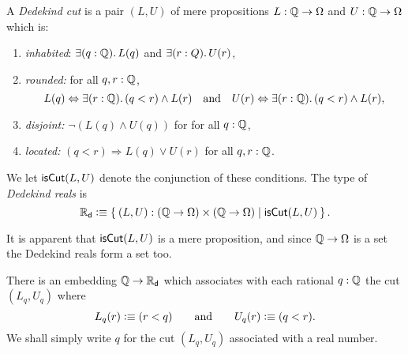 \begin{defn}
  A \emph{Dedekind cut} is a pair $(L, U)$ of mere propositions $L : \mathbb{Q} \to \Omega$ and $U
  : \mathbb{Q} \to \Omega$ which is:
  \begin{enumerate}
  \item \emph{inhabited}: $\exis{q : \Q} L(q)$ and $\exis{r : Q} U(r)$,
  \item \emph{rounded:} for all $q, r : \mathbb{Q}$,
    \begin{equation*}
      L(q) \Leftrightarrow \exis{r : \Q} (q < r) \land L(r)
      \quad\text{and}\quad
      U(r) \Leftrightarrow \exis{r : \Q} (q < r) \land L(r),
    \end{equation*}
  \item \emph{disjoint:} $\lnot (L(q) \land U(q))$ for for all $q : \mathbb{Q}$,
  \item \emph{located:} $(q < r) \Rightarrow L(q) \lor U(r)$ for all $q, r : \mathbb{Q}$.
  \end{enumerate}
  We let $\mathsf{isCut}(L, U)$ denote the conjunction of these conditions. The type of
  \emph{Dedekind reals} is
  \begin{equation*}
    \RD \defeq \setof{ (L, U) : (\Q \to \Omega) \times (\Q \to \Omega) | \dcut(L,U)}.
  \end{equation*}
\end{defn}

It is apparent that $\mathsf{isCut}(L, U)$ is a mere proposition, and since $\mathbb{Q} \to \Omega$ is a set
the Dedekind reals form a set too. 

There is an embedding $\mathbb{Q} \to \mathbb{R}_\mathsf{d}$ which associates with each rational $q : \mathbb{Q}$ the cut
$(L_q, U_q)$ where
%
\begin{equation*}
  L_q(r) \vcentcolon\equiv (r < q)
  \qquad\text{and}\qquad
  U_q(r) \vcentcolon\equiv (q < r).
\end{equation*}
%
We shall simply write $q$ for the cut $(L_q, U_q)$ associated with a real number.

